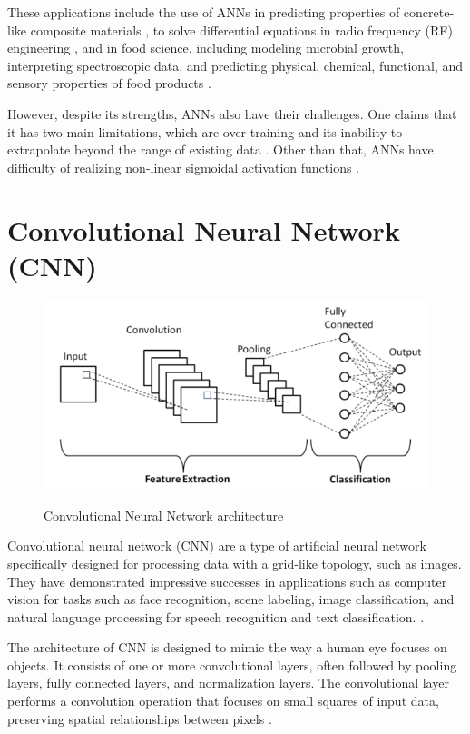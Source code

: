 These applications include the use of ANNs in predicting properties of concrete-like composite materials \parencite{Kasperkiewicz2000}, to solve differential equations in radio frequency (RF) engineering \parencite{Pattanaik2008}, and in food science, including modeling microbial growth, interpreting spectroscopic data, and predicting physical, chemical, functional, and sensory properties of food products \parencite{Huang2007}. 

However, despite its strengths, ANNs also have their challenges. One claims that it has two main limitations, which are over-training and its inability to extrapolate beyond the range of existing data \parencite{Yin2003}. Other than that, ANNs have difficulty of realizing non-linear sigmoidal activation functions \parencite{Mitra2016}.


\newpage
\section{Convolutional Neural Network (CNN)}
\begin{figure}[h]
    \centering
    \includegraphics[scale=0.7]{images/literature review/CNN.png}
    \caption{Convolutional Neural Network architecture}
    \label{fig:CNN}
    \parencite{Phung2019}
\end{figure}
Convolutional neural network (CNN) are a type of artificial neural network specifically designed for processing data with a grid-like topology, such as images. They have demonstrated impressive successes in applications such as computer vision for tasks such as face recognition, scene labeling, image classification, and natural language processing for speech recognition and text classification. \parencite{Bhandare2016ApplicationsOC} \parencite{TaiyabaAnsari2022}.

The architecture of CNN is designed to mimic the way a human eye focuses on objects. It consists of one or more convolutional layers, often followed by pooling layers, fully connected layers, and normalization layers. The convolutional layer performs a convolution operation that focuses on small squares of input data, preserving spatial relationships between pixels \parencite{Purwono2023}.

